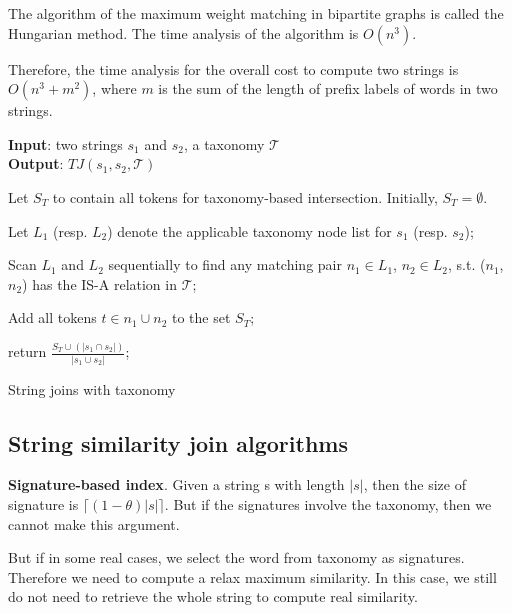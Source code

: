 The algorithm of the maximum weight matching in bipartite graphs is called the Hungarian method. The time analysis of the algorithm is $O(n^3)$.


Therefore, the  time analysis for the overall cost to compute two strings is $O(n^3+m^2)$, where $m$ is the sum of the length of prefix labels of words in two strings.



\begin{algorithm}
{\bf Input}: two strings $s_1$ and $s_2$, a taxonomy $\mathcal{T}$ \\
{\bf Output}: $TJ(s_1,s_2,\mathcal{T})$
\begin{compactenum}[(1)]
\item Let $S_T $ to contain all tokens for taxonomy-based intersection. Initially, $S_T = \emptyset$.
\item Let $L_1$ (resp. $L_2$) denote the applicable taxonomy node list for $s_1$ (resp. $s_2$);
\item Scan $L_1$ and $L_2$ sequentially to find any matching pair $n_1 \in L_1$, $n_2 \in L_2$, s.t. ($n_1$,$n_2$) has the IS-A relation in $\mathcal{T}$;
\item Add all tokens $t \in n_1 \cup n_2$ to the set $S_T$;
\item  return $\frac{S_T \cup (|s_1 \cap s_2|)}{|s_1 \cup s_2|}$;
\end{compactenum}
\caption{String joins with taxonomy}
\label{alg:exactjoin}
\end{algorithm}


\subsection{String similarity join algorithms}




\textbf{Signature-based index}. Given a string s with length $|s|$, then the size of signature is $\lceil (1-\theta)|s| \rceil$. But if the signatures involve the taxonomy, then we cannot make this argument.

But if in some real cases, we select the word from taxonomy as signatures. Therefore we need to compute a relax maximum similarity. In this case, we still do not need to retrieve the whole string to compute real similarity.


